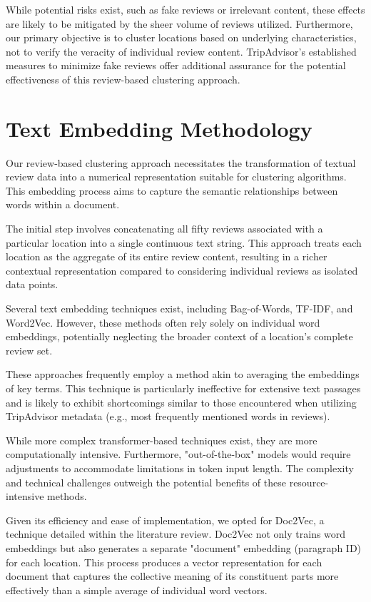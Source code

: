 \documentclass[12pt,a4paper]{report}
\begin{document}
While potential risks exist, such as fake reviews or irrelevant content, these effects are likely to be mitigated by the sheer volume of reviews utilized.  Furthermore, our primary objective is to cluster locations based on underlying characteristics, not to verify the veracity of individual review content.  TripAdvisor's established measures to minimize fake reviews offer additional assurance for the potential effectiveness of this review-based clustering approach.

\section{Text Embedding Methodology}

Our review-based clustering approach necessitates the transformation of textual review data into a numerical representation suitable for clustering algorithms.  This embedding process aims to capture the semantic relationships between words within a document.

The initial step involves concatenating all fifty reviews associated with a particular location into a single continuous text string.  This approach treats each location as the aggregate of its entire review content, resulting in a richer contextual representation compared to considering individual reviews as isolated data points.

Several text embedding techniques exist, including Bag-of-Words, TF-IDF, and Word2Vec. However, these methods often rely solely on individual word embeddings, potentially neglecting the broader context of a location's complete review set.

These approaches frequently employ a method akin to averaging the embeddings of key terms. This technique is particularly ineffective for extensive text passages and is likely to exhibit shortcomings similar to those encountered when utilizing TripAdvisor metadata (e.g., most frequently mentioned words in reviews).

While more complex transformer-based techniques exist, they are more computationally intensive.  Furthermore, "out-of-the-box" models would require adjustments to accommodate limitations in token input length.  The complexity and technical challenges outweigh the potential benefits of these resource-intensive methods.

Given its efficiency and ease of implementation, we opted for Doc2Vec, a technique detailed within the literature review.  Doc2Vec not only trains word embeddings but also generates a separate "document" embedding (paragraph ID) for each location.  This process produces a vector representation for each document that captures the collective meaning of its constituent parts more effectively than a simple average of individual word vectors.
\end{document}
